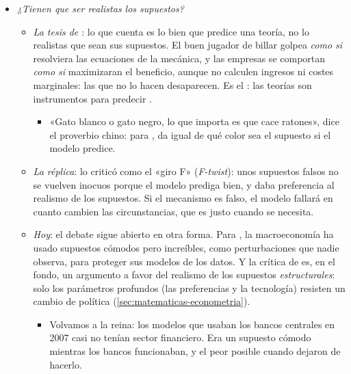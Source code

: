 \documentclass[11pt]{article}
\begin{document}
\begin{itemize}
\item \emph{¿Tienen que ser realistas los supuestos?}
  \begin{itemize}
  \item \emph{La tesis de \textcite{Friedman1953Methodology}}: lo que cuenta es lo bien que predice una teoría, no lo realistas que sean sus supuestos. El buen jugador de billar golpea \emph{como si} resolviera las ecuaciones de la mecánica, y las empresas se comportan \emph{como si} maximizaran el beneficio, aunque no calculen ingresos ni costes marginales: las que no lo hacen desaparecen. Es el : las teorías son instrumentos para predecir .
    \begin{itemize}
    \item «Gato blanco o gato negro, lo que importa es que cace ratones», dice el proverbio chino: para , da igual de qué color sea el supuesto si el modelo predice.
    \end{itemize}
  \item \emph{La réplica}:  lo criticó como el «giro F» (\emph{F-twist}): unos supuestos falsos no se vuelven inocuos porque el modelo prediga bien\nocite{Samuelson1963Problems}, y daba preferencia al realismo de los supuestos. Si el mecanismo es falso, el modelo fallará en cuanto cambien las circunstancias, que es justo cuando se necesita.
  \item \emph{Hoy}: el debate sigue abierto en otra forma. Para  \parencite*{Romer2016Trouble}, la macroeconomía ha usado supuestos cómodos pero increíbles, como perturbaciones que nadie observa, para proteger sus modelos de los datos. Y la crítica de  es, en el fondo, un argumento a favor del realismo de los supuestos \emph{estructurales}: solo los parámetros profundos (las preferencias y la tecnología) resisten un cambio de política (\ref{sec:matematicas-econometria}).
    \begin{itemize}
    \item Volvamos a la reina: los modelos que usaban los bancos centrales en 2007 casi no tenían sector financiero. Era un supuesto cómodo mientras los bancos funcionaban, y el peor posible cuando dejaron de hacerlo.
    \end{itemize}
  \end{itemize}
\end{itemize}

\end{document}
